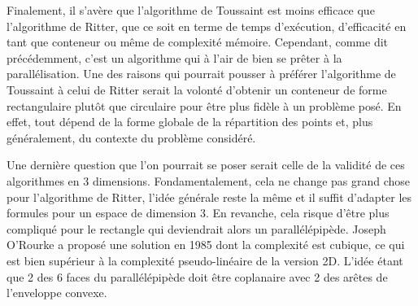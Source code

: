 Finalement, il s'avère que l'algorithme de Toussaint est moins efficace que l'algorithme de Ritter, que ce soit en terme de temps d'exécution, d'efficacité en tant que conteneur ou même de complexité mémoire. Cependant, comme dit précédemment, c'est un algorithme qui à l'air de bien se prêter à la parallélisation. Une des raisons qui pourrait pousser à préférer l'algorithme de Toussaint à celui de Ritter serait la volonté d'obtenir un conteneur de forme rectangulaire plutôt que circulaire pour être plus fidèle à un problème posé. En effet, tout dépend de la forme globale de la répartition des points et, plus généralement, du contexte du problème considéré.

Une dernière question que l'on pourrait se poser serait celle de la validité de ces algorithmes en 3 dimensions. Fondamentalement, cela ne change pas grand chose pour l'algorithme de Ritter, l'idée générale reste la même et il suffit d'adapter les formules pour un espace de dimension 3. En revanche, cela risque d'être plus compliqué pour le rectangle qui deviendrait alors un parallélépipède. Joseph O'Rourke a proposé une solution en 1985 dont la complexité est cubique, ce qui est bien supérieur à la complexité pseudo-linéaire de la version 2D. L'idée étant que 2 des 6 faces du parallélépipède doit être coplanaire avec 2 des arêtes de l'enveloppe convexe.